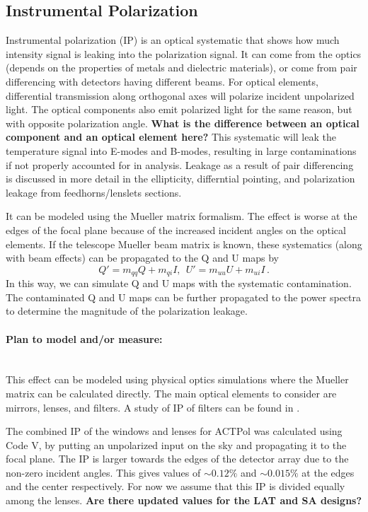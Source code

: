 \subsection{Instrumental Polarization} 
\label{instrumental_polarization}

Instrumental polarization (IP) is an optical systematic that shows how much intensity signal is leaking into the polarization signal. It can come from the optics (depends on the properties of metals and dielectric materials), or come from pair differencing with detectors having different beams. For optical elements, differential transmission along orthogonal axes will polarize incident unpolarized light. The optical components also emit polarized light for the same reason, but with opposite polarization angle. \textbf{What is the difference between an optical component and an optical element here?}
This systematic will leak the temperature signal into E-modes and B-modes, resulting in large contaminations if not properly accounted for in analysis. Leakage as a result of pair differencing is discussed in more detail in the ellipticity, differntial pointing, and polarization leakage from feedhorns/lenslets sections.

It can be modeled using the Mueller matrix formalism. The effect is worse at the edges of the focal plane because of the increased incident angles on the optical elements. If the telescope Mueller beam matrix is known, these systematics (along with beam effects) can be propagated to the Q and U maps by
\begin{equation}
Q' = m_{qq} Q + m_{qi} I, \ \ U' = m_{uu} U + m_{ui} I \, .
\end{equation}
In this way, we can simulate Q and U maps with the systematic contamination. The contaminated Q and U maps can be further propagated to the power spectra to determine the magnitude of the polarization leakage.

\paragraph{Plan to model and/or measure:} \mbox{}\\

This effect can be modeled using physical optics simulations where the Mueller matrix can be calculated directly. 
The main optical elements to consider are mirrors, lenses, and filters.
A study of IP of filters can be found in \cite{pisano2005}.

The combined IP of the windows and lenses for ACTPol was calculated using Code V, 
by putting an unpolarized input on the sky and propagating it to the focal plane.
The IP is larger towards the edges of the detector array due to the non-zero incident angles.
This gives values of $\sim0.12\%$ and $\sim0.015\%$ at the edges and the center respectively.
For now we assume that this IP is divided equally among the lenses. \textbf{Are there updated values for the LAT and SA designs?}

